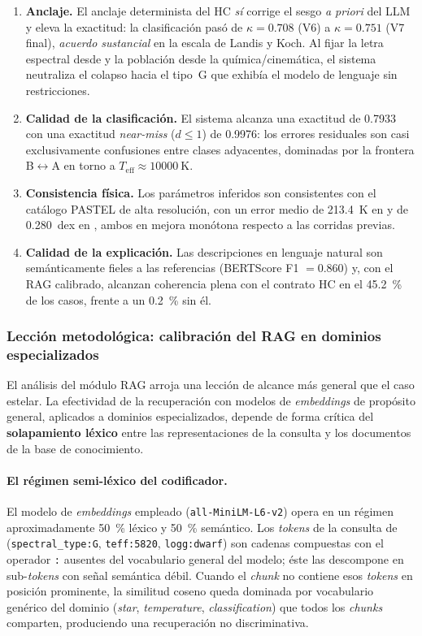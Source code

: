 \begin{enumerate}
  \item \textbf{Anclaje.} El anclaje determinista del HC \emph{sí} corrige el
  sesgo \emph{a priori} del LLM y eleva la exactitud: la clasificación pasó de
  $\kappa=0.708$ (V6) a $\kappa=0.751$ (V7 final), \emph{acuerdo sustancial} en la
  escala de Landis y Koch. Al fijar la letra espectral desde \teff{} y la
  población desde la química/cinemática, el sistema neutraliza el colapso hacia el
  tipo~G que exhibía el modelo de lenguaje sin restricciones.
  \item \textbf{Calidad de la clasificación.} El sistema alcanza una exactitud de
  \num{0.7933} con una exactitud \emph{near-miss} ($d\le1$) de \num{0.9976}: los
  errores residuales son casi exclusivamente confusiones entre clases adyacentes,
  dominadas por la frontera B$\leftrightarrow$A en torno a
  $T_\mathrm{eff}\approx\SI{10000}{\kelvin}$.
  \item \textbf{Consistencia física.} Los parámetros inferidos son consistentes
  con el catálogo PASTEL de alta resolución, con un error medio de
  \SI{213.4}{\kelvin} en \teff{} y de \num{0.280}~dex en \logg{}, ambos en mejora
  monótona respecto a las corridas previas.
  \item \textbf{Calidad de la explicación.} Las descripciones en lenguaje natural
  son semánticamente fieles a las referencias (BERTScore F1 $=0.860$) y, con el
  RAG calibrado, alcanzan coherencia plena con el contrato HC en el
  \SI{45.2}{\percent} de los casos, frente a un \SI{0.2}{\percent} sin él.
\end{enumerate}

\subsubsection{Lección metodológica: calibración del RAG en dominios especializados}
\label{sec:concl-rag}

El análisis del módulo RAG arroja una lección de alcance más general que el caso
estelar. La efectividad de la recuperación con modelos de \emph{embeddings} de
propósito general, aplicados a dominios especializados, depende de forma crítica
del \textbf{solapamiento léxico} entre las representaciones de la consulta y los
documentos de la base de conocimiento.

\paragraph{El régimen semi-léxico del codificador.} El modelo de \emph{embeddings}
empleado (\texttt{all-MiniLM-L6-v2}) opera en un régimen aproximadamente
\SI{50}{\percent} léxico y \SI{50}{\percent} semántico. Los \emph{tokens} de la
consulta de \STELLAR{} (\verb|spectral_type:G|, \verb|teff:5820|,
\verb|logg:dwarf|) son cadenas compuestas con el operador \texttt{:} ausentes del
vocabulario general del modelo; éste las descompone en sub-\emph{tokens} con señal
semántica débil. Cuando el \emph{chunk} no contiene esos \emph{tokens} en posición
prominente, la similitud coseno queda dominada por vocabulario genérico del dominio
(\emph{star}, \emph{temperature}, \emph{classification}) que todos los \emph{chunks}
comparten, produciendo una recuperación no discriminativa.

